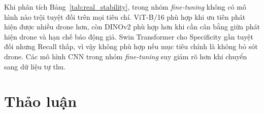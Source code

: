 \documentclass[../DoAn.tex]{subfiles}
\begin{document}
\begin{table}[H]
    \centering
    \renewcommand{\arraystretch}{1.3}
    \scriptsize
    \setlength{\tabcolsep}{3pt}
    \caption{Tổng hợp khả năng tổng quát hóa của các mô hình \textit{fine-tuning} trên dữ liệu tự thu}
    \label{tab:real_stability}
\end{table}

Khi phân tích Bảng~\ref{tab:real_stability}, trong nhóm \textit{fine-tuning} không có mô hình nào trội tuyệt đối trên mọi tiêu chí. ViT-B/16 phù hợp khi ưu tiên phát hiện được nhiều drone hơn, còn DINOv2 phù hợp hơn khi cần cân bằng giữa phát hiện drone và hạn chế báo động giả. Swin Transformer cho Specificity gần tuyệt đối nhưng Recall thấp, vì vậy không phù hợp nếu mục tiêu chính là không bỏ sót drone. Các mô hình CNN trong nhóm \textit{fine-tuning} suy giảm rõ hơn khi chuyển sang dữ liệu tự thu.

\section{Thảo luận}
\end{document}
